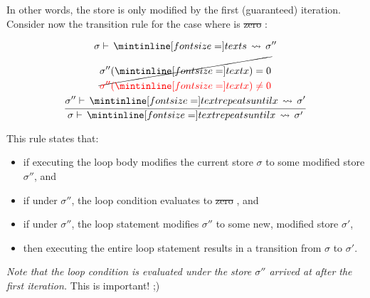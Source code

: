 \noindent In other words, the store is only modified by the first (guaranteed)
iteration. Consider now the transition rule for the case where  is
\st{zero} :

\begin{gather*}
  \frac{
    \begin{gathered}
      \sigma   \vdash \, \ms{s} \, \leadsto \, \sigma''\\
      \cancel{\sigma''(\ms{x}) = 0}\\
      \resub{\sigma''(\ms{x}) \neq 0}\\
      \sigma'' \vdash \, \ms{repeat s until x} \, \leadsto \, \sigma'
    \end{gathered}
    }{\sigma \vdash \, \ms{repeat s until x} \, \leadsto \, \sigma'}
\end{gather*}


This rule states that:

\begin{itemize}
  \item if executing the loop body  modifies the current store $\sigma$ to
    some modified store $\sigma''$, and
  \item if under $\sigma''$, the loop condition  evaluates to
    \st{zero} , and
  \item if under $\sigma''$, the loop statement modifies $\sigma''$ to some new,
    modified store $\sigma'$,
  \item then executing the entire loop statement results in a transition from
    $\sigma$ to $\sigma'$.
\end{itemize}

\emph{Note that the loop condition \emph{} is evaluated under the store
$\sigma''$ arrived at after the first iteration.} This is important! ;)


\Sectend




\iffalse{
\begin{verbatim}

repeat true


  sigma |- s \/-> sigma'
-----------------------------------------
  sigma |- repeat s until x \/-> sigma'
    where sigma'(x) != 0


repeat false

  sigma |- s \/-> sigma''   sigma'' |- repeat s until x \/-> sigma'
--------------------------------------------------------------------
  sigma |- repeat s until x \/-> sigma'
    where sigma''(x) == 0

\end{verbatim}
}\fi
